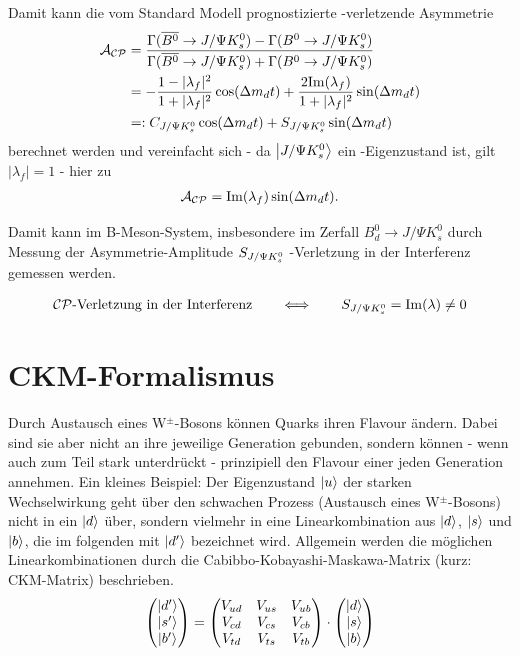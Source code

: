 Damit kann die vom Standard Modell prognostizierte \CP-verletzende Asymmetrie 
\begin{align}
\mathcal{A}_{\text{$\mathcal{CP}$}} &= \frac{\Gamma (\overline{B^0} \rightarrow J/\Psi K_s^0) - \Gamma (B^0 \rightarrow J/\Psi K_s^0)}{\Gamma (\overline{B^0} \rightarrow J/\Psi K_s^0) + \Gamma (B^0 \rightarrow J/\Psi K_s^0)} \\
&= -\frac{1-|\lambda_f|^2}{1+|\lambda_f|^2}\cos(\Delta m_d t) + \frac{2\mathrm{Im}(\lambda_f)}{1+|\lambda_f|^2}\sin(\Delta m_d t) \\
&=: C_{J/\Psi K_s^0} \cos(\Delta m_d t) + S_{J/\Psi K_s^0} \sin(\Delta m_d t)
\end{align}
berechnet werden und vereinfacht sich - da $\Ket{J/\Psi K_s^0}$ ein \CP-Eigenzustand ist, gilt $|\lambda_f| = 1$ - hier zu
\begin{align}
\mathcal{A}_{\text{$\mathcal{CP}$}} = \mathrm{Im}(\lambda_f)\sin(\Delta m_d t) .
\end{align}

Damit kann im B-Meson-System, insbesondere im Zerfall $B_d^0 \rightarrow J/\Psi K_s^0$ durch Messung der Asymmetrie-Amplitude $S_{J/\Psi K_s^0}$ \CP-Verletzung in der Interferenz gemessen werden.

\begin{align}
\text{$\mathcal{CP}$-Verletzung in der Interferenz} \qquad \Longleftrightarrow \qquad S_{J/\Psi K_s^0} = \mathrm{Im}(\lambda)\neq 0
\end{align}

\section{CKM-Formalismus}
Durch Austausch eines W$^{\pm}$-Bosons können Quarks ihren Flavour ändern. Dabei sind sie aber nicht an ihre jeweilige Generation gebunden, sondern können - wenn auch zum Teil stark unterdrückt - prinzipiell den Flavour einer jeden Generation annehmen. Ein kleines Beispiel: Der Eigenzustand $\Ket{u}$ der starken Wechselwirkung geht über den schwachen Prozess (Austausch eines W$^{\pm}$-Bosons) nicht in ein $\Ket{d}$ über, sondern vielmehr in eine Linearkombination aus $\Ket{d}$, $\Ket{s}$ und $\Ket{b}$, die im folgenden mit $\Ket{d'}$ bezeichnet wird. Allgemein werden die möglichen Linearkombinationen durch die Cabibbo-Kobayashi-Maskawa-Matrix (kurz: CKM-Matrix) beschrieben.
\begin{align}
\begin{pmatrix}
\Ket{d'} \\ \Ket{s'} \\ \Ket{b'}
\end{pmatrix}
=
\begin{pmatrix}
V_{ud} & V_{us} & V_{ub} \\
V_{cd} & V_{cs} & V_{cb} \\
V_{td} & V_{ts} & V_{tb} \\
\end{pmatrix}
\cdot
\begin{pmatrix}
\Ket{d} \\ \Ket{s} \\ \Ket{b}
\end{pmatrix}
\end{align}

